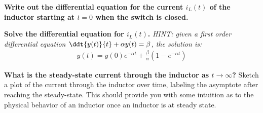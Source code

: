 \begin{enumerate}

\qitem \textbf{Write out the differential equation for the current $i_L(t)$ of the inductor starting at $t = 0$ when the switch is closed.}

\ws{
\vspace{240px}
}


\qitem \textbf{Solve the differential equation for $i_L(t)$.}
\newline \textit{HINT: given a first order differential equation $\ddt{y(t)}{t} + \alpha y(t) = \beta$, the solution is:
\begin{align}
    y(t) = y(0) e^{-\alpha t} + \frac{\beta}{\alpha} (1 - e^{-\alpha t})
\end{align}}
\ws{
\vspace{240px}
}



\qitem \textbf{What is the steady-state current through the inductor as $t \rightarrow \infty$?} Sketch a plot of the current through the inductor over time, labeling the asymptote after reaching the steady-state.
This should provide you with some intuition as to the physical behavior of an inductor once an inductor is at steady state.

\ws{
\vspace{240px}
}

\end{enumerate}
